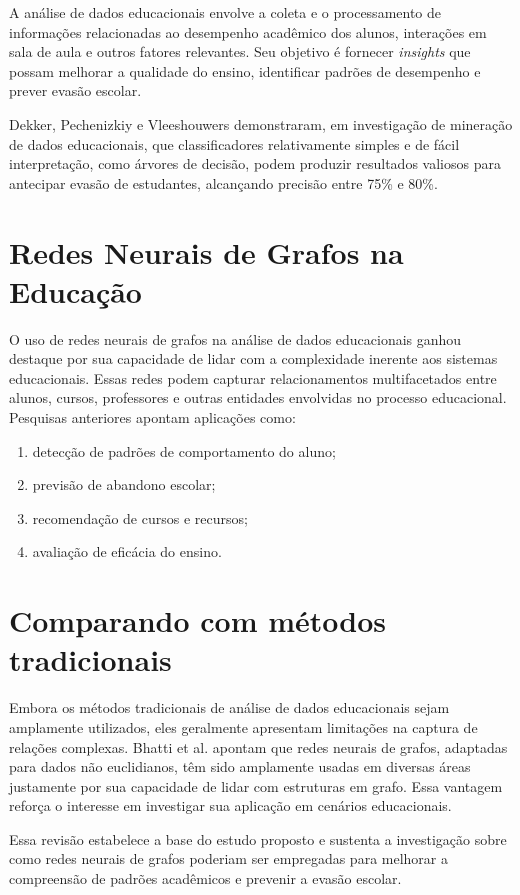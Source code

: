 A an\'alise de dados educacionais envolve a coleta e o processamento de informa\c{c}\~oes relacionadas ao desempenho acad\^emico dos alunos, intera\c{c}\~oes em sala de aula e outros fatores relevantes. Seu objetivo \'e fornecer \textit{insights} que possam melhorar a qualidade do ensino, identificar padr\~oes de desempenho e prever evas\~ao escolar.

Dekker, Pechenizkiy e Vleeshouwers \cite{dekker2009} demonstraram, em investiga\c{c}\~ao de minera\c{c}\~ao de dados educacionais, que classificadores relativamente simples e de f\'acil interpreta\c{c}\~ao, como \'arvores de decis\~ao, podem produzir resultados valiosos para antecipar evas\~ao de estudantes, alcan\c{c}ando precis\~ao entre 75\% e 80\%.

\section{Redes Neurais de Grafos na Educa\c{c}\~ao}
\label{pre:educacao}

O uso de redes neurais de grafos na an\'alise de dados educacionais ganhou destaque por sua capacidade de lidar com a complexidade inerente aos sistemas educacionais. Essas redes podem capturar relacionamentos multifacetados entre alunos, cursos, professores e outras entidades envolvidas no processo educacional. Pesquisas anteriores apontam aplica\c{c}\~oes como:

\begin{enumerate}
    \item detec\c{c}\~ao de padr\~oes de comportamento do aluno;
    \item previs\~ao de abandono escolar;
    \item recomenda\c{c}\~ao de cursos e recursos;
    \item avalia\c{c}\~ao de efic\'acia do ensino.
\end{enumerate}

\section{Comparando com m\'etodos tradicionais}
\label{pre:comparacao}

Embora os m\'etodos tradicionais de an\'alise de dados educacionais sejam amplamente utilizados, eles geralmente apresentam limita\c{c}\~oes na captura de rela\c{c}\~oes complexas. Bhatti et al. \cite{bhatti2023} apontam que redes neurais de grafos, adaptadas para dados n\~ao euclidianos, t\^em sido amplamente usadas em diversas \'areas justamente por sua capacidade de lidar com estruturas em grafo. Essa vantagem refor\c{c}a o interesse em investigar sua aplica\c{c}\~ao em cen\'arios educacionais.

Essa revis\~ao estabelece a base do estudo proposto e sustenta a investiga\c{c}\~ao sobre como redes neurais de grafos poderiam ser empregadas para melhorar a compreens\~ao de padr\~oes acad\^emicos e prevenir a evas\~ao escolar.
